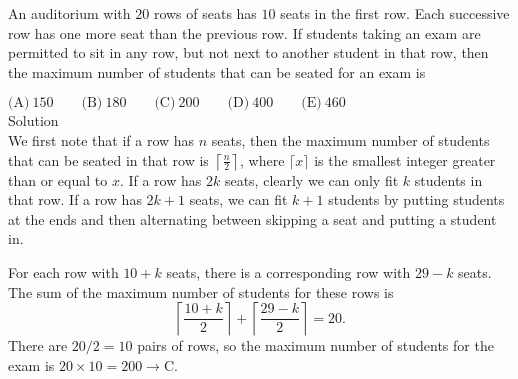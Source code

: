

An auditorium with $20$ rows of seats has $10$ seats in the first row. Each successive row has one more seat than the previous row. If students taking an exam are permitted to sit in any row, but not next to another student in that row, then the maximum number of students that can be seated for an exam is

$\text{(A)}\ 150 \qquad \text{(B)}\ 180 \qquad \text{(C)}\ 200 \qquad \text{(D)}\ 400 \qquad \text{(E)}\ 460$
\\
Solution
\\
We first note that if a row has $n$ seats, then the maximum number of students that can be seated in that row is $\left\lceil \frac{n}{2} \right\rceil$, where $\lceil x \rceil$ is the smallest integer greater than or equal to $x$. If a row has $2k$ seats, clearly we can only fit $k$ students in that row. If a row has $2k+1$ seats, we can fit $k+1$ students by putting students at the ends and then alternating between skipping a seat and putting a student in.

For each row with $10+k$ seats, there is a corresponding row with $29-k$ seats. The sum of the maximum number of students for these rows is \[\left\lceil \frac{10+k}{2}\right\rceil +\left\lceil \frac{29-k}{2} \right\rceil = 20.\] There are $20/2=10$ pairs of rows, so the maximum number of students for the exam is $20\times 10=200\rightarrow \boxed{\text{C}}$.

